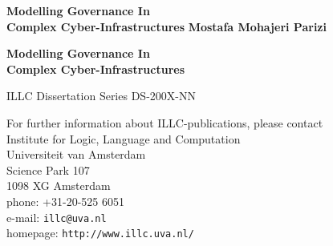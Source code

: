 {\pagestyle{empty}
\newcommand{\printtitle}{%
{\Huge\bfseries Modelling Governance In\\[0.8cm] Complex Cyber-Infrastructures}}    %

\begin{titlepage}
\par\vskip 2cm
\begin{center}
\printtitle
\vfill
{\LARGE\bfseries Mostafa Mohajeri Parizi}                           %
\vskip 2cm
\end{center}
\end{titlepage}
%
%
\mbox{}\newpage
\setcounter{page}{1}

\par\vskip 2cm
\begin{center}
\printtitle
\end{center}

\clearpage
\par\vskip 2cm
\begin{center}
ILLC Dissertation Series DS-200X-NN                 %
\par\vspace {2cm}
\illclogo{10cm}
\par\vspace {2cm}
\noindent%
For further information about ILLC-publications, please contact\\[2ex]
Institute for Logic, Language and Computation\\
Universiteit van Amsterdam\\
Science Park 107\\
1098 XG Amsterdam\\
phone: +31-20-525 6051\\
e-mail: {\tt illc@uva.nl}\\
homepage: {\tt http://www.illc.uva.nl/}
\end{center}
\vfill

}
